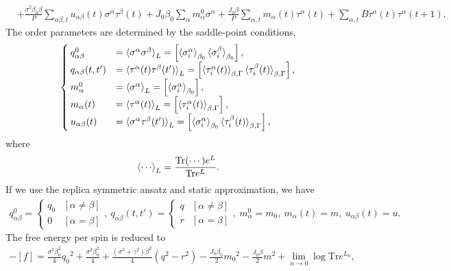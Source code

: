 \documentclass[aps,pra,twocolumn,groupedaddress,longbibliography]{revtex4}
\newcommand{\Sig}{\sigma}
\begin{document}
\begin{widetext}
\begin{align}
	&+\frac{\sigma^2\beta_0 \beta}{P}\sum_{\alpha \beta,t}u_{\alpha \beta}(t)\Sig^{\alpha}\tau^{\beta}(t)+J_0 \beta_0 \sum_{\alpha}m_{\alpha}^{0}\Sig^{\alpha}+\frac{J_0 \beta}{P}\sum_{\alpha,t}m_{\alpha}(t)\tau^{\alpha}(t)+\sum_{\alpha,t}B\tau^{\alpha}(t)\tau^{\alpha}(t+1).
\end{align}
The order parameters are determined by the saddle-point conditions,
\begin{align}
	\begin{cases}
		q_{\alpha \beta}^{0}  &= \braket{\Sig^{\alpha}\Sig^{\beta}}_{L} = \left[\braket{\Sig_{i}^{\alpha}}_{\beta_0}\braket{\Sig_{i}^{\beta}}_{\beta_0}\right], \\
		q_{\alpha \beta}(t,t')&= \braket{\tau^{\alpha}(t)\tau^{\beta}(t')}_{L} = \left[\braket{\tau_i^{\alpha}(t)}_{\beta,\Gamma}\braket{\tau_i^{\beta}(t)}_{\beta,\Gamma}\right], \\
		m_{\alpha}^{0}  &= \braket{\Sig^{\alpha}}_{L} = \left[\braket{\Sig_{i}^{\alpha}}_{\beta_0}\right], \\
		m_{\alpha}(t)&= \braket{\tau^{\alpha}(t)}_{L} = \left[\braket{\tau_i^{\alpha}(t)}_{\beta,\Gamma}\right], \\
		u_{\alpha \beta}(t)&= \braket{\Sig^{\alpha}\tau^{\beta}(t')}_{L} = \left[\braket{\Sig_{i}^{\alpha}}_{\beta_0}\braket{\tau_i^{\beta}(t)}_{\beta,\Gamma}\right], \\
	\end{cases}
\end{align}
where
\begin{align}
	\braket{\cdots}_{L} = \frac{\mathrm{Tr}(\cdots)e^{L}}{\mathrm{Tr}e^{L}}.
\end{align}
If we use the replica symmetric ansatz and static approximation, we have
\begin{align}
	q_{\alpha \beta}^{0}=
	\begin{cases}
		q_0 & [\alpha \neq \beta] \\
		0 & [\alpha = \beta]
	\end{cases},\ 
	q_{\alpha \beta}(t,t')=
	\begin{cases}
		q & [\alpha \neq \beta] \\
		r & [\alpha = \beta]
	\end{cases},\ 
	m_{\alpha}^{0} = m_0,\  m_{\alpha}(t) = m,\  u_{\alpha \beta}(t) = u.
\end{align}
The free energy per spin is reduced to
\begin{align}
	-[f] = \frac{\sigma^2 \beta_0^2}{4}{q_0}^{2}+\frac{\sigma^2 \beta_0^2}{4}+\frac{(\sigma^2+\gamma^2)\beta^2}{4}(q^2-r^2)-\frac{J_0 \beta_0}{2}{m_0}^2-\frac{J_0 \beta}{2}m^2+\lim_{n \to 0}\log{\mathrm{Tr}e^{L_0}},

\end{align}
\end{widetext}
\end{document}
